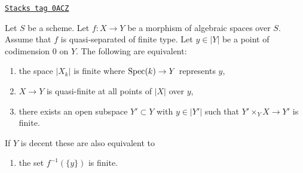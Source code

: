 \begin{lemma}
\label{decent-spaces-lemma-generically-finite}
\href{https://stacks.math.columbia.edu/tag/0ACZ}{\texttt{Stacks tag 0ACZ}}

Let $S$ be a scheme. Let $f : X \to Y$ be a morphism of algebraic spaces
over $S$. Assume that $f$ is quasi-separated of finite type.
Let $y \in |Y|$ be a point of codimension $0$ on $Y$.
The following are equivalent:
\begin{enumerate}
\item the space $|X_k|$ is finite where $\operatorname{Spec}(k) \to Y$ represents $y$,
\item $X \to Y$ is quasi-finite at all points of $|X|$ over $y$,
\item there exists an open subspace $Y' \subset Y$ with $y \in |Y'|$
such that $Y' \times_Y X \to Y'$ is finite.
\end{enumerate}
If $Y$ is decent these are also equivalent to
\begin{enumerate}
\item[(4)] the set $f^{-1}(\{y\})$ is finite.
\end{enumerate}
\end{lemma}

